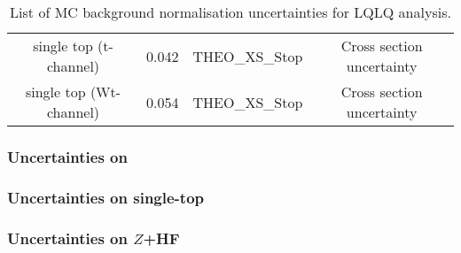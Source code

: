 \begin{table}
\begin{tabular}{c|c|c|c}
    single top (t-channel)     & 0.042               & THEO\_XS\_Stop                      & Cross section uncertainty \\
    single top (Wt-channel)    & 0.054               & THEO\_XS\_Stop                      & Cross section uncertainty \\
    \hline\hline
  \end{tabular}
  \caption{List of MC background normalisation uncertainties for LQLQ analysis.}
  \label{tab:lq_background_modeling:normalisations_list}
\end{table}


\subsubsection{Uncertainties on \ttbar}
\label{sec:acceptance_uncertainties_ttbar_LQ}



\subsubsection{Uncertainties on single-top}
\label{sec:acceptance_uncertainties_stop_LQ}



\subsubsection{Uncertainties on $Z$+HF}
\label{sec:acceptance_uncertainties_ZHF_LQ}


